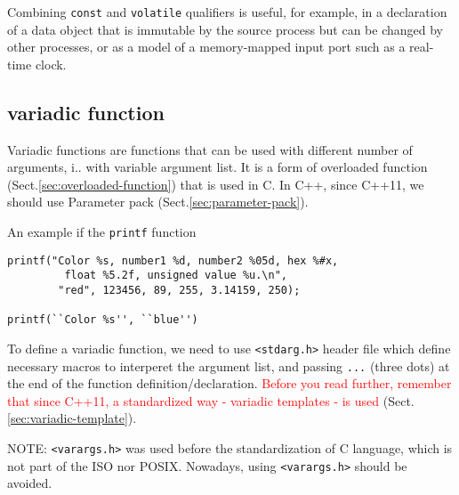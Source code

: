 Combining \verb!const! and \verb!volatile! qualifiers is useful, for example, in
a declaration of a data object that is immutable by the source process but can
be changed by other processes, or as a model of a memory-mapped input port such
as a real-time clock.

\subsection{variadic function}
\label{sec:variadic_function}

Variadic functions are functions that can be used with different number of
arguments, i.. with variable argument list. It is a form of overloaded function
(Sect.\ref{sec:overloaded-function}) that is used in C. In C++, since C++11, we should use 
Parameter pack (Sect.\ref{sec:parameter-pack}).

An example if the \verb!printf! function {\small
\begin{verbatim}
printf("Color %s, number1 %d, number2 %05d, hex %#x, 
         float %5.2f, unsigned value %u.\n",
        "red", 123456, 89, 255, 3.14159, 250);
        
printf(``Color %s'', ``blue'')        
\end{verbatim}
}

To define a variadic function, we need to use \verb!<stdarg.h>! header file
which define necessary macros to interperet the argument list, and passing
\verb!...!  (three dots) at the end of the function definition/declaration.
\textcolor{red}{Before you read further, remember that since C++11, a
standardized way - variadic templates - is used}
(Sect.\ref{sec:variadic-template}).

\begin{mdframed}

NOTE: \verb!<varargs.h>! was used before the standardization of C language, which is
not part of the ISO nor POSIX. Nowadays, using \verb!<varargs.h>! should be avoided. 

\end{mdframed}

